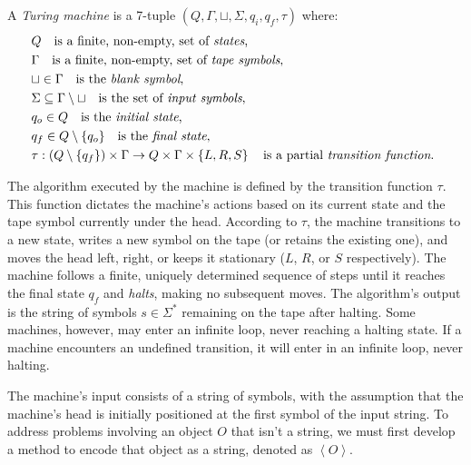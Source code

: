 \begin{definition}
\label{def:Turing-Machine}
A \emph{Turing machine} is a 7-tuple $\left(Q,\Gamma,\sqcup,\Sigma,q_{i},q_{f},\tau\right)$ where:
\begin{align*}
 & Q \quad \text{is a finite, non-empty, set of \emph{states},} \index{Machine State} \\
 & \Gamma \quad \text{is a finite, non-empty, set of \emph{tape symbols},} \index{Tape Symbol} \\
 & \sqcup\in\Gamma \quad \text{is the \emph{blank symbol},} \index{Blank Symbol} \\
 & \Sigma\subseteq\Gamma\setminus\sqcup \quad \text{is the set of \emph{input symbols},}  \index{Input Symbol} \\
 & q_{o}\in Q \quad \text{is the \emph{initial state},} \index{Initial State} \\
 & q_{f}\in Q \setminus \{q_o\} \quad \text{is the \emph{final state},} \index{Final State} \\ 
 & \tau:\left(Q\setminus \{q_{f}\}\right)\times\Gamma \rightarrow  Q\times\Gamma\times\left\{ L,R,S\right\} \quad\text{is a partial \emph{transition function}. \index{Transition Function} }
\end{align*}
\end{definition}

The algorithm executed by the machine is defined by the transition function $\tau$. This function dictates the machine's actions based on its current state and the tape symbol currently under the head. According to $\tau$, the machine transitions to a new state, writes a new symbol on the tape (or retains the existing one), and moves the head left, right, or keeps it stationary ($L$, $R$, or $S$ respectively). The machine follows a finite, uniquely determined sequence of steps until it reaches the final state $q_f$ and \emph{halts}, making no subsequent moves. The algorithm's output is the string of symbols $s \in \Sigma^\ast$ remaining on the tape after halting. Some machines, however, may enter an infinite loop, never reaching a halting state. If a machine encounters an undefined transition, it will enter in an infinite loop, never halting.

The machine's input consists of a string of symbols, with the assumption that the machine's head is initially positioned at the first symbol of the input string. To address problems involving an object $O$ that isn’t a string, we must first develop a method to encode that object as a string, denoted as $\left\langle O \right\rangle$.

